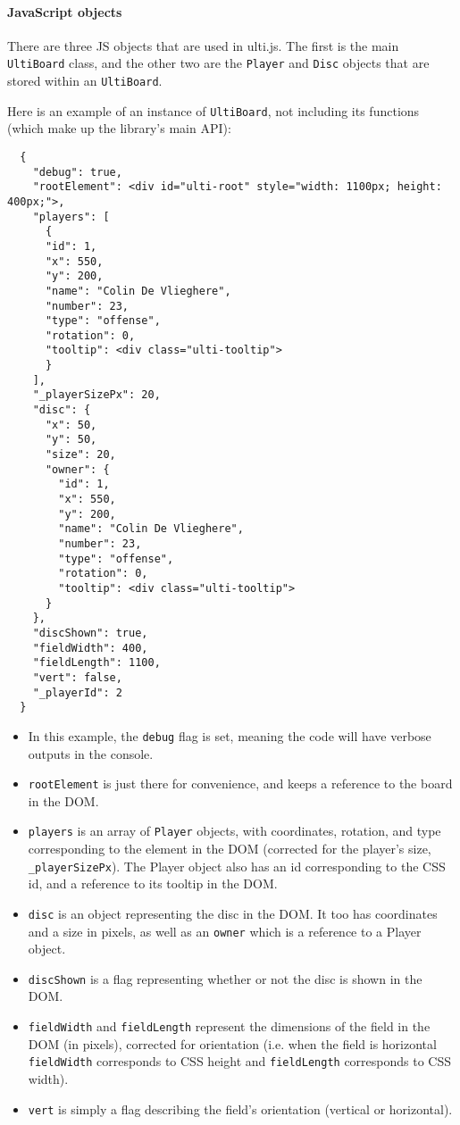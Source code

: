 \documentclass[letterpaper,11pt]{article}
\begin{document}
\paragraph{JavaScript objects}
There are three JS objects that are used in ulti.js. The first is the main \texttt{UltiBoard} class, and the
other two are the \texttt{Player} and \texttt{Disc} objects that are stored within an \texttt{UltiBoard}.

Here is an example of an instance of \texttt{UltiBoard}, not including its functions (which make up
the library's main API):

\begin{verbatim}
  {
    "debug": true,
    "rootElement": <div id="ulti-root" style="width: 1100px; height: 400px;">,
    "players": [
      {
      "id": 1,
      "x": 550,
      "y": 200,
      "name": "Colin De Vlieghere",
      "number": 23,
      "type": "offense",
      "rotation": 0,
      "tooltip": <div class="ulti-tooltip">
      }
    ],
    "_playerSizePx": 20,
    "disc": {
      "x": 50,
      "y": 50,
      "size": 20,
      "owner": {
        "id": 1,
        "x": 550,
        "y": 200,
        "name": "Colin De Vlieghere",
        "number": 23,
        "type": "offense",
        "rotation": 0,
        "tooltip": <div class="ulti-tooltip">
      }
    },
    "discShown": true,
    "fieldWidth": 400,
    "fieldLength": 1100,
    "vert": false,
    "_playerId": 2
  }
\end{verbatim}

\begin{itemize}
  \item In this example, the \texttt{debug} flag is set, meaning the code will have verbose outputs in the console.
  \item \texttt{rootElement} is just there for convenience, and keeps a reference to the board in the DOM.
  \item \texttt{players} is an array of \texttt{Player} objects, with coordinates, rotation, and type corresponding to 
        the element in the DOM (corrected for the player's size, \texttt{\_playerSizePx}).
        The Player object also has an id corresponding to the CSS id, and a reference to its tooltip in the DOM.
  \item \texttt{disc} is an object representing the disc in the DOM. It too has coordinates and a size in pixels,
        as well as an \texttt{owner} which is a reference to a Player object.
  \item \texttt{discShown} is a flag representing whether or not the disc is shown in the DOM.
  \item \texttt{fieldWidth} and \texttt{fieldLength} represent the dimensions of the field in the DOM (in pixels),
        corrected for orientation (i.e. when the field is horizontal \texttt{fieldWidth} corresponds to CSS height
        and \texttt{fieldLength} corresponds to CSS width).
  \item \texttt{vert} is simply a flag describing the field's orientation (vertical or horizontal).
\end{itemize}
\end{document}
